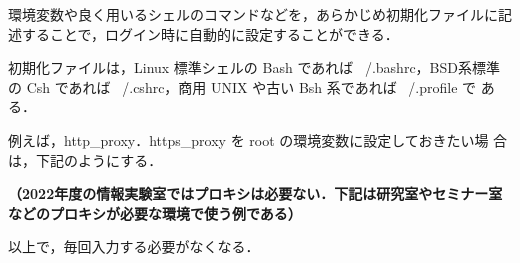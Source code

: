 環境変数や良く用いるシェルのコマンドなどを，あらかじめ初期化ファイルに記
述することで，ログイン時に自動的に設定することができる．

初期化ファイルは，Linux 標準シェルの Bash であれば ~/.bashrc，BSD系標準
の Csh であれば ~/.cshrc，商用 UNIX や古い Bsh 系であれば ~/.profile で
ある．

例えば，http\_proxy．https\_proxy を root の環境変数に設定しておきたい場
合は，下記のようにする．

\textbf{（2022年度の情報実験室ではプロキシは必要ない．下記は研究室やセミナー室などのプロキシが必要な環境で使う例である）}


以上で，毎回入力する必要がなくなる．
